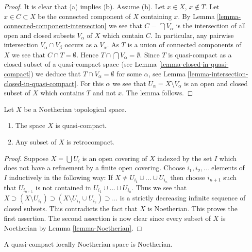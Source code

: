 \begin{proof}
It is clear that (a) implies (b).
Assume (b). Let $x \in X$, $x \not \in T$. Let $x \in C \subset X$
be the connected component of $X$ containing $x$. By
Lemma \ref{lemma-connected-component-intersection}
we see that $C = \bigcap V_\alpha$ is the intersection of all open and
closed subsets $V_\alpha$ of $X$ which contain $C$.
In particular, any pairwise intersection $V_\alpha \cap V_\beta$
occurs as a $V_\alpha$.
As $T$ is a union of connected components
of $X$ we see that $C \cap T = \emptyset$. Hence
$T \cap \bigcap V_\alpha = \emptyset$. Since $T$ is quasi-compact as a
closed subset of a quasi-compact space (see
Lemma \ref{lemma-closed-in-quasi-compact})
we deduce that $T \cap V_\alpha = \emptyset$ for some $\alpha$, see
Lemma \ref{lemma-intersection-closed-in-quasi-compact}.
For this $\alpha$ we see that $U_\alpha = X \setminus V_\alpha$
is an open and closed subset of $X$ which contains $T$ and not $x$.
The lemma follows.
\end{proof}

\begin{lemma}
\label{lemma-Noetherian-quasi-compact}
Let $X$ be a Noetherian topological space.
\begin{enumerate}
\item The space $X$ is quasi-compact.
\item Any subset of $X$ is retrocompact.
\end{enumerate}
\end{lemma}

\begin{proof}
Suppose $X = \bigcup U_i$ is an open covering of $X$ indexed
by the set $I$ which does not have a refinement by a finite
open covering. Choose $i_1, i_2, \ldots $ elements of $I$ inductively
in the following way: If $X \not = U_{i_1} \cup \ldots \cup U_{i_n}$
then choose $i_{n + 1}$ such that $U_{i_{n + 1}}$ is not contained
in $U_{i_1} \cup \ldots \cup U_{i_n}$. Thus we see that
$X \supset (X \setminus U_{i_1}) \supset
(X \setminus U_{i_1} \cup U_{i_2}) \supset \ldots$ is a strictly
decreasing infinite sequence of closed subsets. This contradicts
the fact that $X$ is Noetherian. This proves the first assertion.
The second assertion is now clear since every subset of $X$ is Noetherian by
Lemma \ref{lemma-Noetherian}.
\end{proof}

\begin{lemma}
\label{lemma-quasi-compact-locally-Noetherian-Noetherian}
A quasi-compact locally Noetherian space is Noetherian.
\end{lemma}


